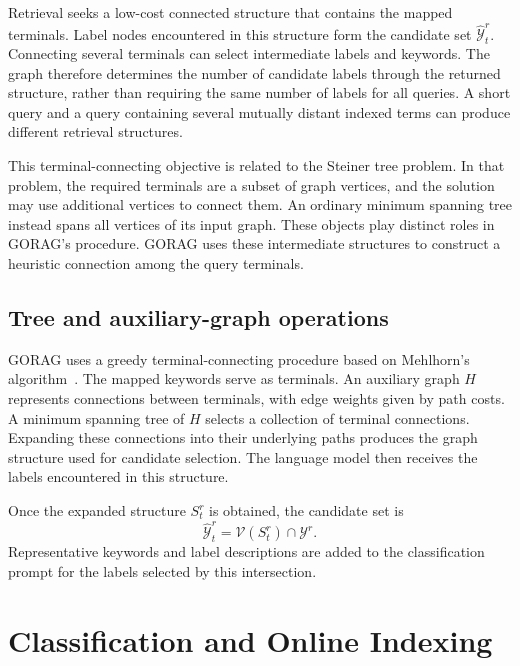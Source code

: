Retrieval seeks a low-cost connected structure that contains the mapped terminals. Label nodes encountered in this structure form the candidate set $\widehat{\mathcal{Y}}_t^r$. Connecting several terminals can select intermediate labels and keywords. The graph therefore determines the number of candidate labels through the returned structure, rather than requiring the same number of labels for all queries. A short query and a query containing several mutually distant indexed terms can produce different retrieval structures.

This terminal-connecting objective is related to the Steiner tree problem. In that problem, the required terminals are a subset of graph vertices, and the solution may use additional vertices to connect them. An ordinary minimum spanning tree instead spans all vertices of its input graph. These objects play distinct roles in GORAG's procedure. GORAG uses these intermediate structures to construct a heuristic connection among the query terminals.

\subsection{Tree and auxiliary-graph operations}
\label{sec:gorag:algorithm}

GORAG uses a greedy terminal-connecting procedure based on Mehlhorn's algorithm~\cite{gorag-mehlhorn1988faster}. The mapped keywords serve as terminals. An auxiliary graph $H$ represents connections between terminals, with edge weights given by path costs. A minimum spanning tree of $H$ selects a collection of terminal connections. Expanding these connections into their underlying paths produces the graph structure used for candidate selection. The language model then receives the labels encountered in this structure.

Once the expanded structure $S_t^r$ is obtained, the candidate set is
\begin{equation}
\widehat{\mathcal{Y}}_t^r=\mathcal{V}(S_t^r)\cap\mathcal{Y}^r.
\label{eq:gorag:candidates}
\end{equation}
Representative keywords and label descriptions are added to the classification prompt for the labels selected by this intersection.

\section{Classification and Online Indexing}
\label{sec:gorag:online}

